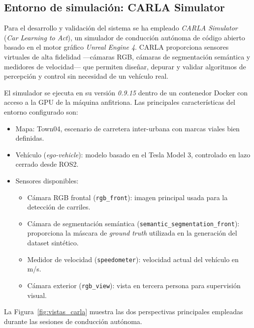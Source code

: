 \documentclass[12pt, a4paper]{article}
\begin{document}
\subsection{Entorno de simulación: CARLA Simulator}

Para el desarrollo y validación del sistema se ha empleado \textit{CARLA Simulator} (\textit{Car Learning to Act}), un simulador de conducción autónoma de código abierto basado en el motor gráfico \textit{Unreal Engine 4}. CARLA proporciona sensores virtuales de alta fidelidad —cámaras RGB, cámaras de segmentación semántica y medidores de velocidad— que permiten diseñar, depurar y validar algoritmos de percepción y control sin necesidad de un vehículo real.

El simulador se ejecuta en su versión \textit{0.9.15} dentro de un contenedor Docker con acceso a la GPU de la máquina anfitriona. Las principales características del entorno configurado son:

\begin{itemize}
    \item Mapa: Town04, escenario de carretera inter-urbana con marcas viales bien definidas.
    \item Vehículo (\textit{ego-vehicle}): modelo basado en el Tesla Model 3, controlado en lazo cerrado desde ROS2.
    \item Sensores disponibles:
    \begin{itemize}
        \item Cámara RGB frontal (\texttt{rgb\_front}): imagen principal usada para la detección de carriles.
        \item Cámara de segmentación semántica (\texttt{semantic\_segmentation\_front}): proporciona la máscara de \textit{ground truth} utilizada en la generación del dataset sintético.
        \item Medidor de velocidad (\texttt{speedometer}): velocidad actual del vehículo en m/s.
        \item Cámara exterior (\texttt{rgb\_view}): vista en tercera persona para supervisión visual.
    \end{itemize}
\end{itemize}

La Figura~\ref{fig:vistas_carla} muestra las dos perspectivas principales empleadas durante las sesiones de conducción autónoma.
\end{document}

